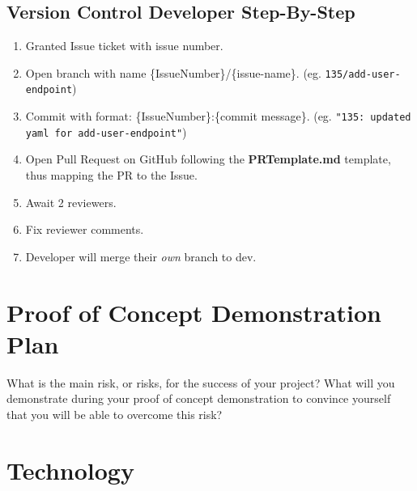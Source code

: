 \documentclass{article}
\def\code#1{\texttt{#1}}
\begin{document}
\subsection{Version Control Developer Step-By-Step}

\begin{enumerate}
	\item Granted Issue ticket with issue number.
	\item Open branch with name \{IssueNumber\}/\{issue-name\}. (eg. \code{135/add-user-endpoint})
	\item Commit with format: \{IssueNumber\}:\{commit message\}. (eg. \code{"135: updated yaml for add-user-endpoint"})
	\item Open Pull Request on GitHub following the \textbf{PRTemplate.md} template, thus mapping the PR to the Issue.
	\item Await 2 reviewers.
	\item Fix reviewer comments.
	\item Developer will merge their \emph{own} branch to dev.
\end{enumerate}

\section{Proof of Concept Demonstration Plan}

What is the main risk, or risks, for the success of your project?  What will you
demonstrate during your proof of concept demonstration to convince yourself that
you will be able to overcome this risk?

\section{Technology}
\end{document}

